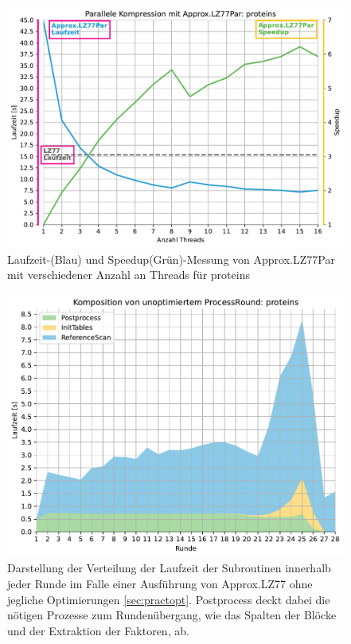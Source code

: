 \begin{figure}[H]
    \centering
    \includegraphics[scale=0.65]{Images/progressive_speedup_proteins.pdf}
    \caption{Laufzeit-(Blau) und Speedup(Grün)-Messung von Approx.LZ77Par mit verschiedener Anzahl an Threads für proteins}
    \label{runtime_threads}
\end{figure}

\begin{figure}[H]
    \centering
    \includegraphics[scale=0.63]{Images/progressive_unopt_stack.pdf}
    \caption{Darstellung der Verteilung der Laufzeit der Subroutinen innerhalb jeder Runde im Falle einer Ausführung von Approx.LZ77 ohne jegliche Optimierungen \ref{sec:practopt}.
    Postprocess deckt dabei die nötigen Prozesse zum Rundenübergang, wie das Spalten der Blöcke und der Extraktion der Faktoren, ab.}
    \label{unopt}
\end{figure}


